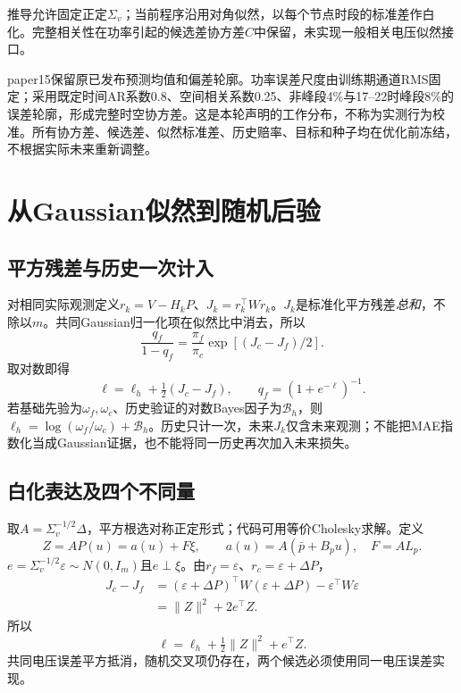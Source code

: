 \documentclass[UTF8,11pt,a4paper,fontset=fandol]{ctexart}
\numberwithin{equation}{section}
\begin{document}
推导允许固定正定$\Sigma_v$；当前程序沿用对角似然，以每个节点时段的标准差作白化。完整相关性在功率引起的候选差协方差$C$中保留，未实现一般相关电压似然接口。

paper15保留原已发布预测均值和偏差轮廓。功率误差尺度由训练期通道RMS固定；采用既定时间AR系数0.8、空间相关系数0.25、非峰段4\%与17--22时峰段8\%的误差轮廓，形成完整时空协方差。这是本轮声明的工作分布，不称为实测行为校准。所有协方差、候选差、似然标准差、历史赔率、目标和种子均在优化前冻结，不根据实际未来重新调整。

\section{从Gaussian似然到随机后验}
\label{sec:posterior}
\subsection{平方残差与历史一次计入}
对相同实际观测定义$r_k=V-H_kP$、$J_k=r_k^\top Wr_k$。$J_k$是标准化平方残差\emph{总和}，不除以$m$。共同Gaussian归一化项在似然比中消去，所以
\begin{equation}
\frac{q_f}{1-q_f}=\frac{\pi_f}{\pi_c}\exp[(J_c-J_f)/2].
\end{equation}
取对数即得
\begin{equation}
\boxed{\ell=\ell_h+\tfrac12(J_c-J_f),\qquad q_f=(1+e^{-\ell})^{-1}.}
\label{eq:posterior}
\end{equation}
若基础先验为$\omega_f,\omega_c$、历史验证的对数Bayes因子为$\mathcal B_h$，则$\ell_h=\log(\omega_f/\omega_c)+\mathcal B_h$。历史只计一次，未来$J_k$仅含未来观测；不能把MAE指数化当成Gaussian证据，也不能将同一历史再次加入未来损失。

\subsection{白化表达及四个不同量}
取$A=\Sigma_v^{-1/2}\Delta$，平方根选对称正定形式；代码可用等价Cholesky求解。定义
\begin{equation}
Z=AP(u)=a(u)+F\xi,\qquad
a(u)=A(\bar p+B_pu),\quad F=AL_p.
\label{eq:whiten}
\end{equation}
$e=\Sigma_v^{-1/2}\varepsilon\sim N(0,I_m)$且$e\perp\xi$。由$r_f=\varepsilon$、$r_c=\varepsilon+\Delta P$，
\begin{align}
J_c-J_f
&=(\varepsilon+\Delta P)^\top W(\varepsilon+\Delta P)-\varepsilon^\top W\varepsilon\\
&=\|Z\|^2+2e^\top Z.
\end{align}
所以
\begin{equation}
\boxed{\ell=\ell_h+\tfrac12\|Z\|^2+e^\top Z.}
\label{eq:ellrandom}
\end{equation}
共同电压误差平方抵消，随机交叉项仍存在，两个候选必须使用同一电压误差实现。
\end{document}

